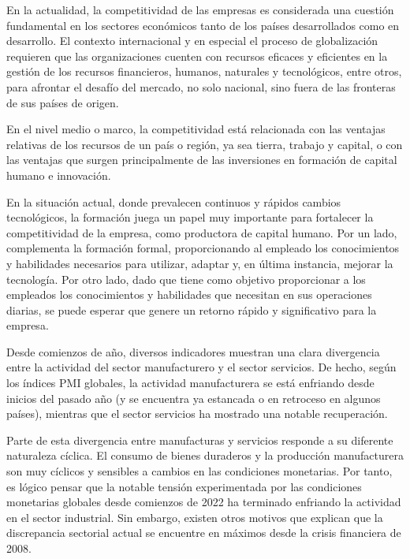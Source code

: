         En la actualidad, la competitividad de las empresas es considerada una cuestión fundamental en los sectores económicos tanto de los países desarrollados como en desarrollo. El contexto internacional y en especial el proceso de globalización requieren que las organizaciones cuenten con recursos eficaces y eficientes en la gestión de los recursos financieros, humanos, naturales y tecnológicos, entre otros, para afrontar el desafío del mercado, no solo nacional, sino fuera de las fronteras de sus países de origen. \cite{labarca2007consideraciones}
        
        En el nivel medio o marco, la competitividad está relacionada con las ventajas relativas de los recursos de un país o región, ya sea tierra, trabajo y capital, o con las ventajas que surgen principalmente de las inversiones en formación de capital humano e innovación. \cite{padilla2006instrumento}
        
        En la situación actual, donde prevalecen continuos y rápidos cambios tecnológicos, la formación juega un papel muy importante para fortalecer la competitividad de la empresa, como productora de capital humano. Por un lado, complementa la formación formal, proporcionando al empleado los conocimientos y habilidades necesarios para utilizar, adaptar y, en última instancia, mejorar la tecnología. Por otro lado, dado que tiene como objetivo proporcionar a los empleados los conocimientos y habilidades que necesitan en sus operaciones diarias, se puede esperar que genere un retorno rápido y significativo para la empresa.\cite{casar1993competitividad}
        
        Desde comienzos de año, diversos indicadores muestran una clara divergencia entre la actividad del sector manufacturero y el sector servicios. De hecho, según los índices PMI globales, la actividad manufacturera se está enfriando desde inicios del pasado año (y se encuentra ya estancada o en retroceso en algunos países), mientras que el sector servicios ha mostrado una notable recuperación.
        
        Parte de esta divergencia entre manufacturas y servicios responde a su diferente naturaleza cíclica. El consumo de bienes duraderos y la producción manufacturera son muy cíclicos y sensibles a cambios en las condiciones monetarias. Por tanto, es lógico pensar que la notable tensión experimentada por las condiciones monetarias globales desde comienzos de 2022 ha terminado enfriando la actividad en el sector industrial. Sin embargo, existen otros motivos que explican que la discrepancia sectorial actual se encuentre en máximos desde la crisis financiera de 2008. \cite{CaixaBank}
        
